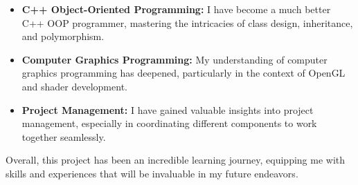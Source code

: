 \begin{itemize}
    \item \textbf{C++ Object-Oriented Programming:} I have become a much better C++ OOP programmer, mastering the intricacies of class design, inheritance, and polymorphism.
    \item \textbf{Computer Graphics Programming:} My understanding of computer graphics programming has deepened, particularly in the context of OpenGL and shader development.
    \item \textbf{Project Management:} I have gained valuable insights into project management, especially in coordinating different components to work together seamlessly.
\end{itemize}

Overall, this project has been an incredible learning journey, equipping me with skills and experiences that will be invaluable in my future endeavors.







